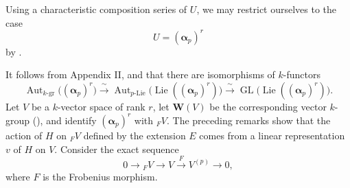 

Using a characteristic composition series of \(U\), we may
restrict ourselves to the case
\[
  U=(\boldsymbol\alpha_p)^r
\]
by .

It follows from Appendix II,  and  that there are
isomorphisms of \(k\)-functors
\[
  \operatorname{Aut}_{k\text{-}\mathrm{gr}}
    \bigl((\boldsymbol\alpha_p)^r\bigr)
  \xrightarrow{\ \sim\ }
  \operatorname{Aut}_{p\text{-}\mathrm{Lie}}
    \bigl(\operatorname{Lie}((\boldsymbol\alpha_p)^r)\bigr)
  \xrightarrow{\ \sim\ }
  \operatorname{GL}
    \bigl(\operatorname{Lie}((\boldsymbol\alpha_p)^r)\bigr).
\]
Let \(V\) be a \(k\)-vector space of rank \(r\), let
\(\mathbf W(V)\) be the corresponding vector \(k\)-group
(), and identify \((\boldsymbol\alpha_p)^r\) with
\({}_F V\).  The preceding remarks show that the action of \(H\)
on \({}_F V\) defined by the extension \(E\) comes from a linear
representation \(v\) of \(H\) on \(V\).  Consider the exact
sequence
\[
  \tag{*}\label{sga3:xvii:proposition:5-4-1:equation:star}
  0\longrightarrow {}_F V\longrightarrow V
    \xrightarrow{F}V^{(p)}\longrightarrow0,
\]
where \(F\) is the Frobenius morphism.
